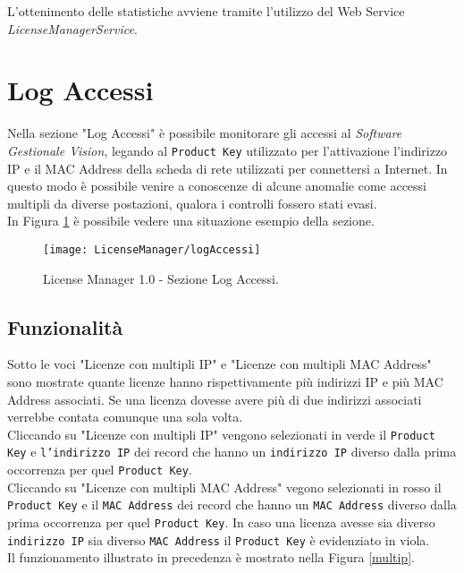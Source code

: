 L'ottenimento delle statistiche avviene tramite l'utilizzo del Web Service \textit{LicenseManagerService}.

\section{Log Accessi}

Nella sezione "Log Accessi" è possibile monitorare gli accessi al \textit{Software Gestionale Vision}, legando al \texttt{Product Key} utilizzato per l’attivazione l’indirizzo IP e il MAC Address della scheda di rete utilizzati per connettersi a Internet. In questo modo è possibile venire a conoscenze di alcune anomalie come accessi multipli da diverse postazioni, qualora i controlli fossero stati evasi.\\
In Figura \ref{accessi} è possibile vedere una situazione esempio della sezione.
\begin{figure}[!h] 
    \centering 
    \texttt{[image: LicenseManager/logAccessi]} 
    \caption{License Manager 1.0 - Sezione Log Accessi.}
\label{accessi}

\end{figure}

\subsection{Funzionalità}

Sotto le voci "Licenze con multipli IP" e "Licenze con multipli MAC Address" sono mostrate quante licenze hanno rispettivamente più indirizzi IP e più MAC Address associati.
Se una licenza dovesse avere più di due indirizzi associati verrebbe contata comunque una sola volta.\\
Cliccando su "Licenze con multipli IP" vengono selezionati in verde il \texttt{Product Key} e \texttt{l’indirizzo IP} dei record che hanno un \texttt{indirizzo IP} diverso dalla prima occorrenza per quel \texttt{Product Key}.\\
Cliccando su "Licenze con multipli MAC Address" vegono selezionati in rosso il \texttt{Product Key} e il \texttt{MAC Address} dei record che hanno un \texttt{MAC Address} diverso dalla prima occorrenza per quel \texttt{Product Key}.
In caso una licenza avesse sia diverso \texttt{indirizzo IP} sia diverso \texttt{MAC Address} il \texttt{Product Key} è evidenziato in viola.\\
Il funzionamento illustrato in precedenza è mostrato nella Figura \ref{multip}.

